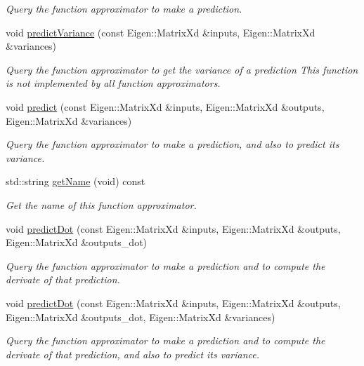 \begin{DoxyCompactItemize}
\begin{DoxyCompactList}\small\item\em Query the function approximator to make a prediction. \end{DoxyCompactList}\item 
void \hyperlink{classDmpBbo_1_1FunctionApproximatorGMR_a81bcaa6c544bee98c1c625c81860fe4c}{predict\+Variance} (const Eigen\+::\+Matrix\+Xd \&inputs, Eigen\+::\+Matrix\+Xd \&variances)
\begin{DoxyCompactList}\small\item\em Query the function approximator to get the variance of a prediction This function is not implemented by all function approximators. \end{DoxyCompactList}\item 
void \hyperlink{classDmpBbo_1_1FunctionApproximatorGMR_ab74ea106ee37e27900826c1fa1a4331c}{predict} (const Eigen\+::\+Matrix\+Xd \&inputs, Eigen\+::\+Matrix\+Xd \&outputs, Eigen\+::\+Matrix\+Xd \&variances)
\begin{DoxyCompactList}\small\item\em Query the function approximator to make a prediction, and also to predict its variance. \end{DoxyCompactList}\item 
std\+::string \hyperlink{classDmpBbo_1_1FunctionApproximatorGMR_ad4c95407e44ba3e16b9651f9b81cd0e6}{get\+Name} (void) const 
\begin{DoxyCompactList}\small\item\em Get the name of this function approximator. \end{DoxyCompactList}\item 
void \hyperlink{classDmpBbo_1_1FunctionApproximatorGMR_a9f885377585c39b1cccf4c4f3a0f496b}{predict\+Dot} (const Eigen\+::\+Matrix\+Xd \&inputs, Eigen\+::\+Matrix\+Xd \&outputs, Eigen\+::\+Matrix\+Xd \&outputs\+\_\+dot)
\begin{DoxyCompactList}\small\item\em Query the function approximator to make a prediction and to compute the derivate of that prediction. \end{DoxyCompactList}\item 
void \hyperlink{classDmpBbo_1_1FunctionApproximatorGMR_a52655b0b7e5a0c1e0e74a175956658d4}{predict\+Dot} (const Eigen\+::\+Matrix\+Xd \&inputs, Eigen\+::\+Matrix\+Xd \&outputs, Eigen\+::\+Matrix\+Xd \&outputs\+\_\+dot, Eigen\+::\+Matrix\+Xd \&variances)
\begin{DoxyCompactList}\small\item\em Query the function approximator to make a prediction and to compute the derivate of that prediction, and also to predict its variance. \end{DoxyCompactList}\end{DoxyCompactItemize}
